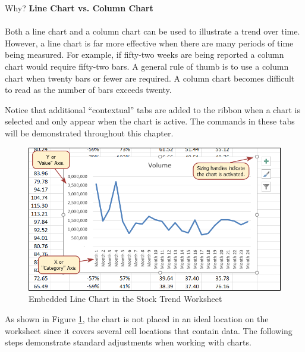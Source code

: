 \begin{center}
	\begin{infobox}{Why?}
		\textbf{Line Chart vs. Column Chart}
		\\
		\\
		Both a line chart and a column chart can be used to illustrate a trend over time. However, a line chart is far more effective when there are many periods of time being measured. For example, if fifty-two weeks are being reported a column chart would require fifty-two bars. A general rule of thumb is to use a column chart when twenty bars or fewer are required. A column chart becomes difficult to read as the number of bars exceeds twenty.
	\end{infobox}
\end{center}

Notice that additional ``contextual'' tabs are added to the ribbon when a chart is selected and only appear when the chart is active. The commands in these tabs will be demonstrated throughout this chapter.

\begin{figure}[H]
	\centering
	\includegraphics[width=\maxwidth{.95\linewidth}]{gfx/ch04_fig03}
	\caption{Embedded Line Chart in the Stock Trend Worksheet}
	\label{04:fig03}
\end{figure}

As shown in Figure \ref{04:fig03}, the chart is not placed in an ideal location on the worksheet since it covers several cell locations that contain data. The following steps demonstrate standard adjustments when working with charts.

